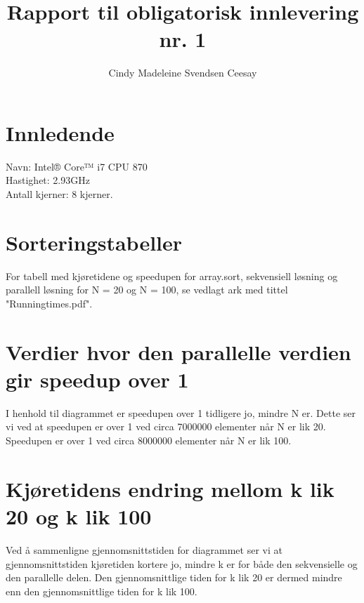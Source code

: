 \documentclass[]{article}
\title{Rapport til obligatorisk innlevering nr. 1}
\author{Cindy Madeleine Svendsen Ceesay}
\begin{document}
\maketitle
\section{Innledende}
Navn: Intel® Core™ i7 CPU 870\\
Hastighet: 2.93GHz\\
Antall kjerner: 8 kjerner.

\section{Sorteringstabeller}

For tabell med kjøretidene og speedupen for array.sort, sekvensiell løsning og parallell løsning for N = 20 og N = 100, se vedlagt ark med tittel "Runningtimes.pdf".

\section{Verdier hvor den parallelle verdien gir speedup over 1}

I henhold til diagrammet er speedupen over 1 tidligere jo, mindre N er. Dette ser vi ved at speedupen er over 1 ved circa 7000000 elementer når N er lik 20. Speedupen er over 1 ved circa 8000000  elementer når N er lik 100.

\section{Kjøretidens endring mellom k lik 20 og k lik 100}

Ved å sammenligne gjennomsnittstiden for diagrammet ser vi at gjennomsnittstiden kjøretiden kortere jo, mindre k er for både den sekvensielle og den parallelle delen. Den gjennomsnittlige tiden for k lik 20 er dermed mindre enn den gjennomsnittlige tiden for k lik 100.
\end{document}
